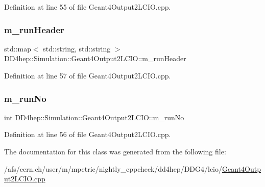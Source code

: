 Definition at line 55 of file Geant4\+Output2\+L\+C\+I\+O.\+cpp.

\hypertarget{class_d_d4hep_1_1_simulation_1_1_geant4_output2_l_c_i_o_ad4dec33a908a569451f8f51eb3954eba}{}\label{class_d_d4hep_1_1_simulation_1_1_geant4_output2_l_c_i_o_ad4dec33a908a569451f8f51eb3954eba} 
\subsubsection{\texorpdfstring{m\+\_\+run\+Header}{m\_runHeader}}
{\footnotesize\ttfamily std\+::map$<$ std\+::string, std\+::string $>$ D\+D4hep\+::\+Simulation\+::\+Geant4\+Output2\+L\+C\+I\+O\+::m\+\_\+run\+Header\hspace{0.3cm}{\ttfamily [protected]}}



Definition at line 57 of file Geant4\+Output2\+L\+C\+I\+O.\+cpp.

\hypertarget{class_d_d4hep_1_1_simulation_1_1_geant4_output2_l_c_i_o_a6f4cb683c0f3b248ee518aa9ca7cf0c6}{}\label{class_d_d4hep_1_1_simulation_1_1_geant4_output2_l_c_i_o_a6f4cb683c0f3b248ee518aa9ca7cf0c6} 
\subsubsection{\texorpdfstring{m\+\_\+run\+No}{m\_runNo}}
{\footnotesize\ttfamily int D\+D4hep\+::\+Simulation\+::\+Geant4\+Output2\+L\+C\+I\+O\+::m\+\_\+run\+No\hspace{0.3cm}{\ttfamily [protected]}}



Definition at line 56 of file Geant4\+Output2\+L\+C\+I\+O.\+cpp.



The documentation for this class was generated from the following file\+:\begin{DoxyCompactItemize}
\item 
/afs/cern.\+ch/user/m/mpetric/nightly\+\_\+cppcheck/dd4hep/\+D\+D\+G4/lcio/\hyperlink{_geant4_output2_l_c_i_o_8cpp}{Geant4\+Output2\+L\+C\+I\+O.\+cpp}\end{DoxyCompactItemize}
